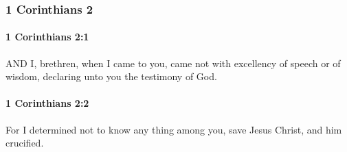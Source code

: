 	\subsubsection{1 Corinthians 2}
		\label{1CORINTHIANS-2}
		
		\paragraph{1 Corinthians 2:1} %
			\label{1CORINTHIANS-2-1}

			AND I, brethren, when I came to you, came not with excellency of speech or of wisdom, declaring unto you the testimony of God.

			\begin{framed}
			\scriptsize
				\begin{compactdesc}
					\item[SBLG] 
				\end{compactdesc}
			\end{framed}

		\paragraph{1 Corinthians 2:2} %
			\label{1CORINTHIANS-2-2}

			For I determined not to know any thing among you, save Jesus Christ, and him crucified.

